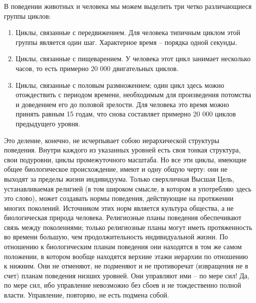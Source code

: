 \documentclass{book}
\begin{document}
В поведении животных и человека мы можем выделить три четко различающиеся группы циклов:
\begin{enumerate}
 \item Циклы, связанные с передвижением. Для человека типич­ным циклом этой группы является один шаг. Характерное время -- порядка одной секунды.
 \item Циклы, связанные с пищеварением. У человека этот цикл занимает несколько часов, то есть примерно 20 000 двигатель­ных циклов.
 \item Циклы, связанные с половым размножением; один цикл здесь можно отождествить с периодом времени, необходимым для произведения потомства и доведением его до половой зрелости. Для человека это время можно принять равным 15 годам, что снова составляет примерно 20 000 циклов преды­дущего уровня.
\end{enumerate}

Это деление, конечно, не исчерпывает собою иерархической структуры поведения. Внутри каждого из указанных уровней есть своя тонкая структура, свои подуровни, циклы промежуточного масштаба. Но все эти циклы, имеющие общее биоло­гическое происхождение, имеют и одну общую черту: они не выходят за пределы жизни индивидуума. Только сверхличная Высшая Цель, устанавливаемая религией (в том широком смысле, в котором я употребляю здесь это слово), может со­здавать нормы поведения, действующие на протяжении многих поколений. Источником этих норм является культура общества, а не биологическая природа человека. Религиозные планы поведения обеспечивают связь между поколениями; только религиозные планы могут иметь протяженность во времени большую, чем продолжительность индивидуальной жизни. По отношению к биологическим планам поведения они находятся в том же самом положении, в котором вообще находятся верхние этажи иерархии по отношению к нижним. Они не отменяют, не подменяют и не противоречат (извращения не в счет) 
пла­нам поведения низших уровней. Они управляют ими -- по мере сил! Да, по мере сил, ибо управление невозможно без сбоев и не тождественно полной власти. Управление, повторяю, не есть подмена собой.
\end{document}
